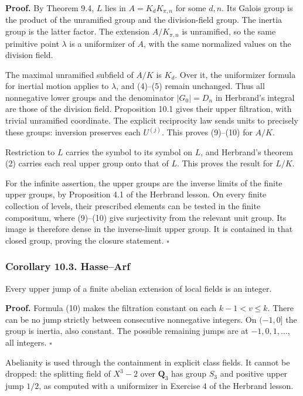 \documentclass[11pt,a4paper]{article}
\begin{document}
\textbf{Proof.} By Theorem 9.4, \(L\) lies in \(A=K_dK_{\pi,n}\) for
some \(d,n\). Its Galois group is the product of the unramified group
and the division-field group. The inertia group is the latter factor.
The extension \(A/K_{\pi,n}\) is unramified, so the same primitive point
\(\lambda\) is a uniformizer of \(A\), with the same normalized values
on the division field.

The maximal unramified subfield of \(A/K\) is \(K_d\). Over it, the
uniformizer formula for inertial motion applies to \(\lambda\), and
(4)--(5) remain unchanged. Thus all nonnegative lower groups and the
denominator \(|G_0|=D_n\) in Herbrand's integral are those of the
division field. Proposition 10.1 gives their upper filtration, with
trivial unramified coordinate. The explicit reciprocity law sends units
to precisely these groups: inversion preserves each \(U^{(j)}\). This
proves (9)--(10) for \(A/K\).

Restriction to \(L\) carries the symbol to its symbol on \(L\), and
Herbrand's theorem (2) carries each real upper group onto that of \(L\).
This proves the result for \(L/K\).

For the infinite assertion, the upper groups are the inverse limits of
the finite upper groups, by Proposition 4.1 of the Herbrand lesson. On
every finite collection of levels, their prescribed elements can be
tested in the finite compositum, where (9)--(10) give surjectivity from
the relevant unit group. Its image is therefore dense in the
inverse-limit upper group. It is contained in that closed group, proving
the closure statement. \(\square\)

\subsubsection{Corollary 10.3.
Hasse--Arf}\label{corollary-10.3.-hassearf}

Every upper jump of a finite abelian extension of local fields is an
integer.

\textbf{Proof.} Formula (10) makes the filtration constant on each
\(k-1<v\leq k\). There can be no jump strictly between consecutive
nonnegative integers. On \((-1,0]\) the group is inertia, also constant.
The possible remaining jumps are at \(-1,0,1,\ldots\), all integers.
\(\square\)

Abelianity is used through the containment in explicit class fields. It
cannot be dropped: the splitting field of \(X^3-2\) over \(\mathbf Q_3\)
has group \(S_3\) and positive upper jump \(1/2\), as computed with a
uniformizer in Exercise 4 of the Herbrand lesson.
\end{document}
